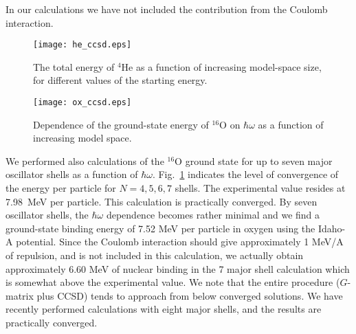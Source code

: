 \documentclass[fleqn,12pt,twoside]{article}
\begin{document}
In our calculations we have not included the contribution
from the Coulomb interaction.  

\begin{figure}[htb]
\begin{minipage}[t]{80mm}
\texttt{[image: he\_ccsd.eps]}
\caption{The total energy of $^4$He as a function of increasing
model-space size, for different values of the starting energy.}
\label{fig_com}
\end{minipage}
%
\hspace{\fill}
%
\begin{minipage}[t]{75mm}
\texttt{[image: ox\_ccsd.eps]}
\caption{Dependence of the ground-state energy of $^{16}$O  on $\hbar\omega$
as a function of increasing model space.}
\label{fig_ox_hw}
\end{minipage}
\end{figure}

We performed also calculations of the $^{16}$O 
ground state for up to seven major oscillator shells as a function
of $\hbar\omega$. Fig.~\ref{fig_ox_hw} indicates the level of convergence
of the energy per particle for $N=4,5,6,7$ shells. The experimental value
resides at 7.98~MeV per particle.  This calculation is practically converged. 
By seven oscillator shells, the $\hbar\omega$ dependence becomes rather
minimal and we find a ground-state binding energy of 7.52 MeV per particle in
oxygen using the Idaho-A potential. Since the Coulomb interaction should give
approximately 1 MeV/A of repulsion, and is not included in this 
calculation, we actually obtain approximately 6.60 MeV of nuclear binding
in the 7 major shell calculation which is somewhat above the experimental
value. We note that the entire procedure ($G$-matrix plus CCSD) tends to 
approach from below converged solutions. 
We have recently performed calculations with eight major shells, and the 
results are practically converged.
 
\end{document}
